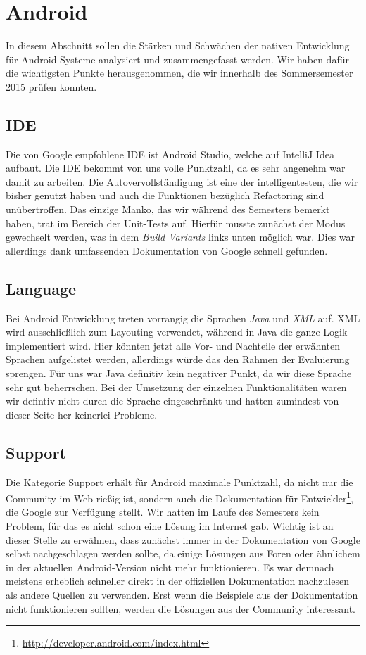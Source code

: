 \section{Android}
In diesem Abschnitt sollen die Stärken und Schwächen der nativen Entwicklung für Android Systeme analysiert und zusammengefasst werden. Wir haben dafür die wichtigsten Punkte herausgenommen, die wir innerhalb des Sommersemester 2015 prüfen konnten.

\subsection{IDE}
Die von Google empfohlene IDE ist Android Studio, welche auf IntelliJ Idea aufbaut. Die IDE bekommt von uns volle Punktzahl, da es sehr angenehm war damit zu arbeiten. Die Autovervollständigung ist eine der intelligentesten, die wir bisher genutzt haben und auch die Funktionen bezüglich Refactoring sind unübertroffen. Das einzige Manko, das wir während des Semesters bemerkt haben, trat im Bereich der Unit-Tests auf. Hierfür musste zunächst der Modus gewechselt werden, was in dem \textit{Build Variants} links unten möglich war. Dies war allerdings dank umfassenden Dokumentation von Google schnell gefunden.

\subsection{Language}
Bei Android Entwicklung treten vorrangig die Sprachen \textit{Java} und \textit{XML} auf. XML wird ausschließlich zum Layouting verwendet, während in Java die ganze Logik implementiert wird. Hier könnten jetzt alle Vor- und Nachteile der erwähnten Sprachen aufgelistet werden, allerdings würde das den Rahmen der Evaluierung sprengen. Für uns war Java definitiv kein negativer Punkt, da wir diese Sprache sehr gut beherrschen. Bei der Umsetzung der einzelnen Funktionalitäten waren wir defintiv nicht durch die Sprache ein\-ge\-schränkt und hatten zumindest von dieser Seite her keinerlei Probleme.

\subsection{Support}
Die Kategorie Support erhält für Android maximale Punkt\-zahl, da nicht nur die Community im Web rießig ist, sondern auch die Dokumentation für Entwickler\footnote{\url{http://developer.android.com/index.html}}, die Google zur Verfügung stellt. Wir hatten im Laufe des Semesters kein Problem, für das es nicht schon eine Lösung im Internet gab. Wichtig ist an dieser Stelle zu erwähnen, dass zunächst immer in der Dokumentation von Google selbst nachgeschlagen werden sollte, da einige Lösungen aus Foren oder ähnlichem in der aktuellen Android-Version nicht mehr funktionieren. Es war demnach meistens erheblich schneller direkt in der offiziellen Dokumentation nachzulesen als andere Quellen zu verwenden. Erst wenn die Beispiele aus der Dokumentation nicht funktionieren sollten, werden die Lösungen aus der Community interessant.

